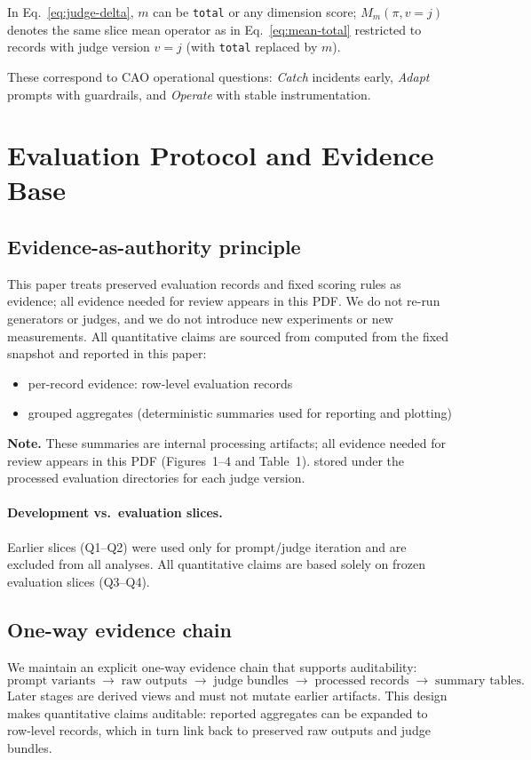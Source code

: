 \documentclass{article}
\begin{document}
\noindent
In Eq.~\ref{eq:judge-delta}, $m$ can be \texttt{total} or any dimension score; $M_m(\pi, v{=}j)$ denotes the same slice mean operator as in Eq.~\ref{eq:mean-total} restricted to records with judge version $v=j$ (with \texttt{total} replaced by $m$).

These correspond to CAO operational questions: \emph{Catch} incidents early, \emph{Adapt} prompts with guardrails, and \emph{Operate} with stable instrumentation.

\section{Evaluation Protocol and Evidence Base}
\subsection{Evidence-as-authority principle}
This paper treats preserved evaluation records and fixed scoring rules as evidence; all evidence needed for review appears in this PDF.
We do not re-run generators or judges, and we do not introduce new experiments or new measurements.
All quantitative claims are sourced from computed from the fixed snapshot and reported in this paper:
\begin{itemize}[leftmargin=1.2em, itemsep=1pt, topsep=2pt]
  \item per-record evidence: row-level evaluation records
  \item grouped aggregates (deterministic summaries used for reporting and plotting)
\end{itemize}
\noindent\textbf{Note.} These summaries are internal processing artifacts; all evidence needed for review appears in this PDF (Figures~1--4 and Table~1).
stored under the processed evaluation directories for each judge version.
\paragraph{Development vs.\ evaluation slices.}
Earlier slices (Q1--Q2) were used only for prompt/judge iteration and are excluded from all analyses.
All quantitative claims are based solely on frozen evaluation slices (Q3--Q4).

\subsection{One-way evidence chain}
We maintain an explicit one-way evidence chain that supports auditability:
\[
\text{prompt variants} \;\rightarrow\; \text{raw outputs} \;\rightarrow\; \text{judge bundles} \;\rightarrow\;
\text{processed records} \;\rightarrow\; \text{summary tables}.
\]
Later stages are derived views and must not mutate earlier artifacts.
This design makes quantitative claims auditable: reported aggregates can be expanded to row-level records, which in turn link back to preserved raw outputs and judge bundles.
\end{document}
